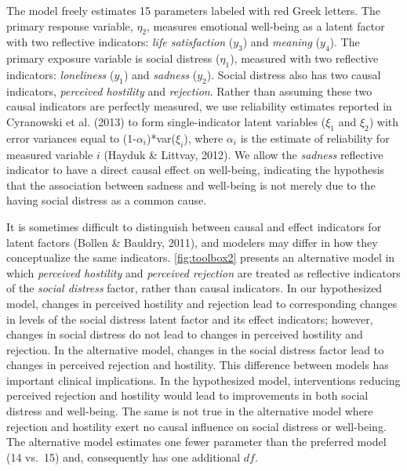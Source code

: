 \documentclass[
  english,
  doc]{apa6}
\begin{document}
The model freely estimates 15 parameters labeled with red Greek letters. The primary response variable, \(\eta_{2}\), measures emotional well-being as a latent factor with two reflective indicators: \emph{life satisfaction} (\(y_3\)) and \emph{meaning} (\(y_4\)). The primary exposure variable is social distress (\(\eta_{1}\)), measured with two reflective indicators: \emph{loneliness} (\(y_1\)) and \emph{sadness} (\(y_2\)). Social distress also has two causal indicators, \emph{perceived hostility} and \emph{rejection}. Rather than assuming these two causal indicators are perfectly measured, we use reliability estimates reported in Cyranowski et al. (2013) to form single-indicator latent variables (\(\xi_1\) and \(\xi_2\)) with error variances equal to (1-\(\alpha_i\))*var(\(\xi_i\)), where \(\alpha_i\) is the estimate of reliability for measured variable \(i\) (Hayduk \& Littvay, 2012). We allow the \emph{sadness} reflective indicator to have a direct causal effect on well-being, indicating the hypothesis that the association between sadness and well-being is not merely due to the having social distress as a common cause.

It is sometimes difficult to distinguish between causal and effect indicators for latent factors (Bollen \& Bauldry, 2011), and modelers may differ in how they conceptualize the same indicators. \ref{fig:toolbox2} presents an alternative model in which \emph{perceived hostility} and \emph{perceived rejection} are treated as reflective indicators of the \emph{social distress} factor, rather than causal indicators. In our hypothesized model, changes in perceived hostility and rejection lead to corresponding changes in levels of the social distress latent factor and its effect indicators; however, changes in social distress do not lead to changes in perceived hostility and rejection. In the alternative model, changes in the social distress factor lead to changes in perceived rejection and hostility. This difference between models has important clinical implications. In the hypothesized model, interventions reducing perceived rejection and hostility would lead to improvements in both social distress and well-being. The same is not true in the alternative model where rejection and hostility exert no causal influence on social distress or well-being. The alternative model estimates one fewer parameter than the preferred model (14 vs.~15) and, consequently has one additional \(df\).
\end{document}
